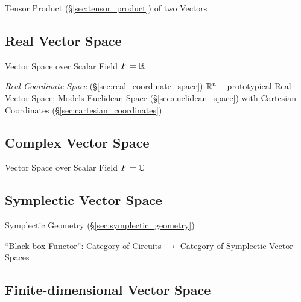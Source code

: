 Tensor Product (\S\ref{sec:tensor_product}) of two Vectors



\subsection{Real Vector Space}\label{sec:real_vector_space}

Vector Space over Scalar Field $F = \mathbb{R}$

\fist \emph{Real Coordinate Space} (\S\ref{sec:real_coordinate_space})
$\mathbb{R}^n$ -- prototypical Real Vector Space; Models Euclidean Space
(\S\ref{sec:euclidean_space}) with Cartesian Coordinates
(\S\ref{sec:cartesian_coordinates})



\subsection{Complex Vector Space}\label{sec:complex_vector_space}

Vector Space over Scalar Field $F = \mathbb{C}$



\subsection{Symplectic Vector Space}\label{sec:symplectic_vectorspace}

Symplectic Geometry (\S\ref{sec:symplectic_geometry})

``Black-box Functor'': Category of Circuits $\rightarrow$ Category of
Symplectic Vector Spaces %



\subsection{Finite-dimensional Vector Space}
\label{sec:finite_dimensional_vectorspace}

